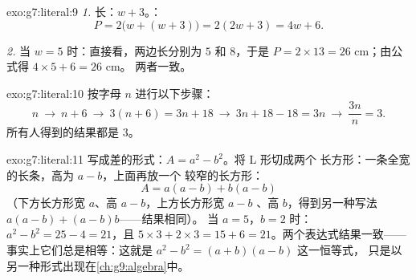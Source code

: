 \begin{solution}{exo:g7:literal:9}
\emph{1.} 长：$w + 3$。：
\[
P = 2\bigl(w + (w + 3)\bigr) = 2(2w + 3) = 4w + 6 .
\]

\emph{2.} 当 $w = 5$ 时：直接看，两边长分别为 $5$ 和 $8$，于是
$P = 2 \times 13 = 26$ cm；由公式得 $4 \times 5 + 6 = 26$ cm。
两者一致。
\end{solution}

\begin{solution}{exo:g7:literal:10}
按字母 $n$ 进行以下步骤：
\[
n \ \to\ n + 6 \ \to\ 3(n + 6) = 3n + 18 \ \to\ 3n + 18 - 18 = 3n
\ \to\ \frac{3n}{n} = 3 .
\]
所有人得到的结果都是 $3$。
\end{solution}

\begin{solution}{exo:g7:literal:11}
写成差的形式：$A = a^2 - b^2$。将 L 形切成两个
长方形：一条全宽的长条，高为 $a - b$，上面再放一个
较窄的长方形：
\[
A = a(a - b) + b(a - b)
\]
（下方长方形宽 $a$、高 $a - b$，上方长方形宽 $a - b$
、高 $b$，得到另一种写法 $a(a-b) + (a-b)b$——结果相同）。
当 $a = 5$，$b = 2$ 时：$a^2 - b^2 = 25 - 4 = 21$，且
$5 \times 3 + 2 \times 3 = 15 + 6 = 21$。两个表达式结果一致——
事实上它们总是相等：这就是 $a^2 - b^2 = (a + b)(a - b)$ 这一恒等式，
只是以另一种形式出现在\cref{ch:g9:algebra}中。
\end{solution}

